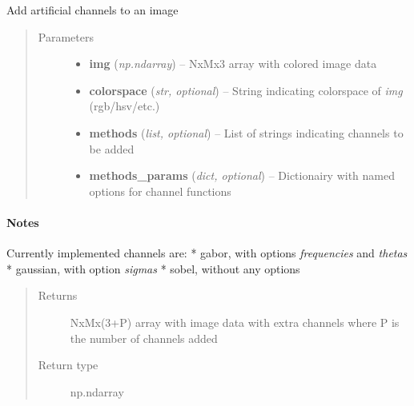 \documentclass[letterpaper,10pt,english]{sphinxmanual}
\begin{document}
\begin{fulllineitems}
\label{classification:flamingo.classification.channels.add_channels}
Add artificial channels to an image
\begin{quote}\begin{description}
\item[{Parameters}] \leavevmode\begin{itemize}
\item {} 
\textbf{img} (\emph{np.ndarray}) -- NxMx3 array with colored image data

\item {} 
\textbf{colorspace} (\emph{str, optional}) -- String indicating colorspace of \emph{img} (rgb/hsv/etc.)

\item {} 
\textbf{methods} (\emph{list, optional}) -- List of strings indicating channels to be added

\item {} 
\textbf{methods\_params} (\emph{dict, optional}) -- Dictionairy with named options for channel functions

\end{itemize}

\end{description}\end{quote}
\paragraph{Notes}

Currently implemented channels are:
* gabor, with options \emph{frequencies} and \emph{thetas}
* gaussian, with option \emph{sigmas}
* sobel, without any options
\begin{quote}\begin{description}
\item[{Returns}] \leavevmode
NxMx(3+P) array with image data with extra channels where P
is the number of channels added

\item[{Return type}] \leavevmode
np.ndarray

\end{description}\end{quote}

\end{fulllineitems}
\end{document}
